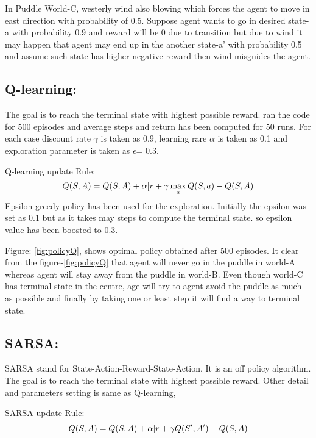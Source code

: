 \documentclass[preprint,12pt]{elsarticle}
\begin{document}
In Puddle World-C, westerly wind also blowing which forces the agent to move in east direction with probability of 0.5. Suppose agent wants to go in desired state-a with probability 0.9 and reward will be 0 due to transition but due to wind it may happen that agent may end up in the another state-a' with probability 0.5 and assume such state has higher negative reward then wind misguides the agent.

\subsection{Q-learning:}
The goal is to reach the terminal state with highest possible reward. ran the code for 500 episodes and average steps and return has been computed for 50 runs. 
For each case discount rate $\gamma$ is taken as 0.9, learning rare $\alpha$ is taken as 0.1 and exploration parameter is taken as $\epsilon$= 0.3. 

Q-learning update Rule: \cite{sutton2018reinforcement}
\begin{equation}
Q(S,A) = Q(S,A) + \alpha[r + \gamma \space \max_{a}Q(S,a) -Q(S,A)
\end{equation}
Epsilon-greedy policy has been used for the exploration. Initially the epsilon was set as 0.1 but as it takes may steps to compute the terminal state. so epsilon value has been boosted to 0.3. 


Figure: \ref{fig:policyQ}, shows optimal policy obtained after 500 episodes. It clear from the figure-\ref{fig:policyQ} that agent will never go in the puddle in world-A whereas agent will stay away from the puddle in world-B. Even though world-C has terminal state in the centre, age will try to agent avoid the puddle as much as possible and finally by taking one or least step it will find a way to terminal state. 



\subsection{SARSA:}
SARSA stand for State-Action-Reward-State-Action. It is an off policy algorithm. The goal is to reach the terminal state with highest possible reward. Other detail and parameters setting is same as Q-learning,

SARSA update Rule: \cite{sutton2018reinforcement}
\begin{equation}
Q(S,A) = Q(S,A) + \alpha[r + \gamma \space Q(S',A') -Q(S,A)
\end{equation}
\end{document}
